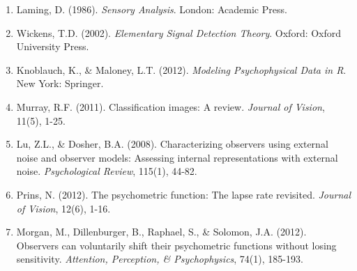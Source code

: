 \documentclass[11pt,a4paper]{article}
\begin{document}
\begin{enumerate}
\item Laming, D. (1986). \textit{Sensory Analysis}. London: Academic Press.

\item Wickens, T.D. (2002). \textit{Elementary Signal Detection Theory}. Oxford: Oxford University Press.

\item Knoblauch, K., \& Maloney, L.T. (2012). \textit{Modeling Psychophysical Data in R}. New York: Springer.

\item Murray, R.F. (2011). Classification images: A review. \textit{Journal of Vision}, 11(5), 1-25.

\item Lu, Z.L., \& Dosher, B.A. (2008). Characterizing observers using external noise and observer models: Assessing internal representations with external noise. \textit{Psychological Review}, 115(1), 44-82.

\item Prins, N. (2012). The psychometric function: The lapse rate revisited. \textit{Journal of Vision}, 12(6), 1-16.

\item Morgan, M., Dillenburger, B., Raphael, S., \& Solomon, J.A. (2012). Observers can voluntarily shift their psychometric functions without losing sensitivity. \textit{Attention, Perception, \& Psychophysics}, 74(1), 185-193.
\end{enumerate}
\end{document}
